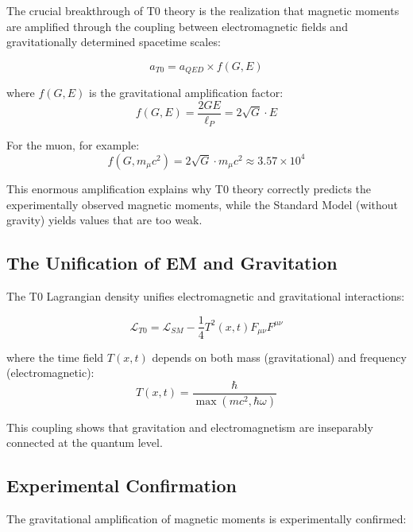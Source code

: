 \documentclass[12pt,a4paper]{article}
\theoremstyle{definition}
\begin{document}
	The crucial breakthrough of T0 theory is the realization that magnetic moments are amplified through the coupling between electromagnetic fields and gravitationally determined spacetime scales:
	
	\begin{equation}
		a_{T0} = a_{QED} \times f(G, E)
	\end{equation}
	
	where $f(G, E)$ is the gravitational amplification factor:
	\begin{equation}
		f(G, E) = \frac{2GE}{\ell_P} = 2\sqrt{G} \cdot E
	\end{equation}
	
	For the muon, for example:
	\begin{equation}
		f(G, m_\mu c^2) = 2\sqrt{G} \cdot m_\mu c^2 \approx 3.57 \times 10^4
	\end{equation}
	
	This enormous amplification explains why T0 theory correctly predicts the experimentally observed magnetic moments, while the Standard Model (without gravity) yields values that are too weak.
	
	\subsection{The Unification of EM and Gravitation}
	
	The T0 Lagrangian density unifies electromagnetic and gravitational interactions:
	
	\begin{equation}
		\mathcal{L}_{T0} = \mathcal{L}_{SM} - \frac{1}{4}T^2(x,t) F_{\mu\nu} F^{\mu\nu}
	\end{equation}
	
	where the time field $T(x,t)$ depends on both mass (gravitational) and frequency (electromagnetic):
	\begin{equation}
		T(x,t) = \frac{\hbar}{\max(mc^2, \hbar\omega)}
	\end{equation}
	
	This coupling shows that gravitation and electromagnetism are inseparably connected at the quantum level.
	
	\subsection{Experimental Confirmation}
	
	The gravitational amplification of magnetic moments is experimentally confirmed:
	
\end{document}
